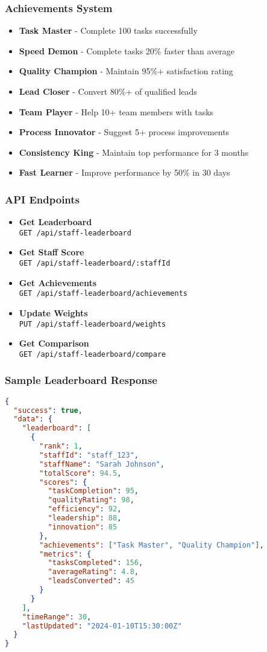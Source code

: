 \documentclass[12pt,a4paper]{article}
\newcommand{\apiendpoint}[2]{\textbf{#1} \\ \texttt{#2}}
\newcommand{\samplecode}[1]{\begin{lstlisting}[language=JSON]#1\end{lstlisting}}
\begin{document}
\subsubsection{Achievements System}
\begin{itemize}
    \item \textbf{Task Master} - Complete 100 tasks successfully
    \item \textbf{Speed Demon} - Complete tasks 20\% faster than average
    \item \textbf{Quality Champion} - Maintain 95\%+ satisfaction rating
    \item \textbf{Lead Closer} - Convert 80\%+ of qualified leads
    \item \textbf{Team Player} - Help 10+ team members with tasks
    \item \textbf{Process Innovator} - Suggest 5+ process improvements
    \item \textbf{Consistency King} - Maintain top performance for 3 months
    \item \textbf{Fast Learner} - Improve performance by 50\% in 30 days
\end{itemize}

\subsubsection{API Endpoints}
\begin{itemize}
    \item \apiendpoint{Get Leaderboard}{GET /api/staff-leaderboard}
    \item \apiendpoint{Get Staff Score}{GET /api/staff-leaderboard/:staffId}
    \item \apiendpoint{Get Achievements}{GET /api/staff-leaderboard/achievements}
    \item \apiendpoint{Update Weights}{PUT /api/staff-leaderboard/weights}
    \item \apiendpoint{Get Comparison}{GET /api/staff-leaderboard/compare}
\end{itemize}

\subsubsection{Sample Leaderboard Response}
\samplecode{
{
  "success": true,
  "data": {
    "leaderboard": [
      {
        "rank": 1,
        "staffId": "staff_123",
        "staffName": "Sarah Johnson",
        "totalScore": 94.5,
        "scores": {
          "taskCompletion": 95,
          "qualityRating": 98,
          "efficiency": 92,
          "leadership": 88,
          "innovation": 85
        },
        "achievements": ["Task Master", "Quality Champion"],
        "metrics": {
          "tasksCompleted": 156,
          "averageRating": 4.8,
          "leadsConverted": 45
        }
      }
    ],
    "timeRange": 30,
    "lastUpdated": "2024-01-10T15:30:00Z"
  }
}
}
\end{document}
